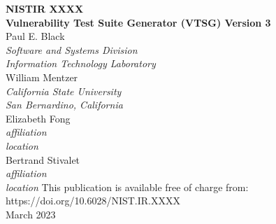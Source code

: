 \documentclass[12pt]{article}
\newcommand{\pubnumber}{XXXX}
\newcommand{\DOI}{https://doi.org/10.6028/NIST.IR.XXXX}
\newcommand{\monthyear}{March 2023}
\newcommand{\paperTitle}{Vulnerability Test Suite Generator (VTSG) Version 3}
\begin{document}
\begin{titlepage}
\begin{flushright}
\LARGE{\textbf{NISTIR \pubnumber}}\\
\vfill 
\Huge{\textbf{\paperTitle}}\\
    \vfill
    \normalsize 
    Paul E. Black\\
     \textit{Software and Systems Division}\\
     \textit{Information Technology Laboratory}\\
     \vspace{12pt}
    William Mentzer\\
     \textit{California State University}\\
     \textit{San Bernardino, California}\\
     \vspace{12pt}
    Elizabeth Fong \\
     \textit{affiliation}\\
     \textit{location}\\
     \vspace{12pt}
    Bertrand Stivalet \\
     \textit{affiliation}\\
     \textit{location}
\vfill
\normalsize This publication is available free of charge from:\\
\DOI\\
\vfill
\normalsize \monthyear
\vfill


\end{flushright}
\end{titlepage}
\end{document}
